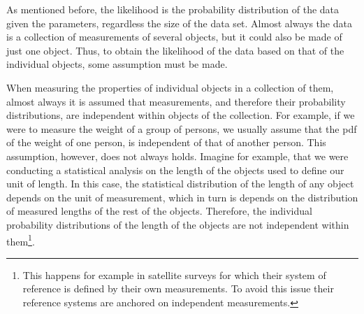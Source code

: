 %

As mentioned before, the likelihood is the probability distribution of the data given the parameters, regardless the size of the data set. Almost always the data is a collection of measurements of several objects, but it could also be made of just one object. Thus, to obtain the likelihood of the data based on that of the individual objects, some assumption must be made. 

When measuring the properties of individual objects in a collection of them, almost always it is assumed that measurements, and therefore their probability distributions, are independent within objects of the collection. For example, if we were to measure the weight of a group of persons, we usually assume that the pdf of the weight of one person, is independent of that of another person. This assumption, however, does not always holds. Imagine for example, that we were conducting a statistical analysis on the length of the objects used to define our unit of length. In this case, the statistical distribution of the length of any object depends on the unit of measurement, which in turn is depends on the distribution of measured lengths of the rest of the objects. Therefore, the individual probability distributions of the length of the objects are not independent within them\footnote{This happens for example in satellite surveys for which their system of reference is defined by their own measurements. To avoid this issue their reference systems are anchored on independent measurements.}. 

